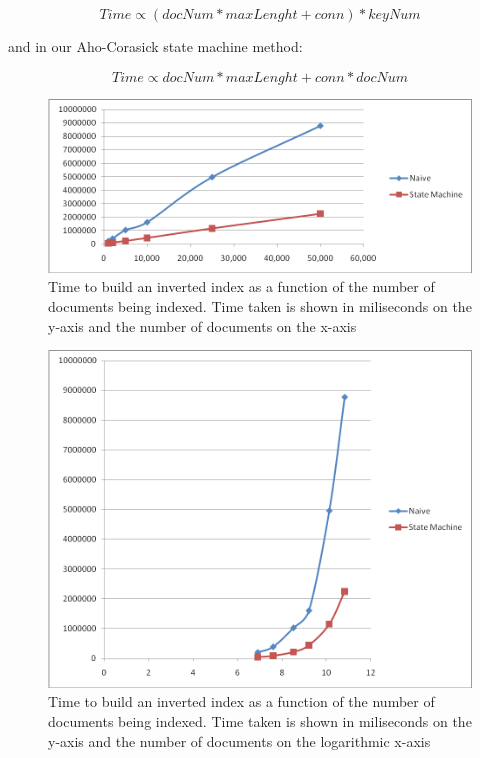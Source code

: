 \documentclass[10pt]{report}
\begin{document}
\[Time \propto (docNum * maxLenght + conn) * keyNum\]
 
and in our Aho-Corasick state machine method: 

\[Time \propto docNum * maxLenght + conn * docNum\]


\begin{figure}
  \begin{center}
    \includegraphics[width=\textwidth,height=!]{naivesizecorpus}
  \end{center}
  \caption{Time to build an inverted index as a function of the
      number of documents being indexed. Time taken is shown in
      miliseconds on the y-axis and the number of documents on the
      x-axis} 
  \label{fig:naivesizecorpus}
\end{figure} 


\begin{figure}
  \begin{center}
    \includegraphics[width=\textwidth,height=!]{naivesizecorpuslog}
  \end{center}
  \caption{Time to build an inverted index as a function of the
      number of documents being indexed. Time taken is shown in
      miliseconds on the y-axis and the number of documents on the
      logarithmic x-axis} 
  \label{fig:naivesizecorpuslog}
\end{figure} 
\end{document}
